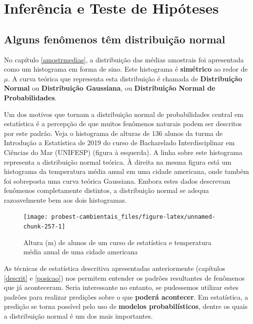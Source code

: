\documentclass[
]{book}
\begin{document}
\hypertarget{part-inferuxeancia-e-teste-de-hipuxf3teses}{%
\part{Inferência e Teste de Hipóteses}\label{part-inferuxeancia-e-teste-de-hipuxf3teses}}

\hypertarget{normdist}{%
\chapter{Alguns fenômenos têm distribuição normal}\label{normdist}}

No capítulo \ref{amostrmedias}, a distribuição das médias amostrais foi apresentada como um histograma em forma de sino. Este histograma é \textbf{simétrico} ao redor de \(\mu\). A curva teórica que representa esta distribuição é chamada de \textbf{Distribuição Normal} ou \textbf{Distribuição Gaussiana}, ou \textbf{Distribuição Normal de Probabilidades}.

Um dos motivos que tornam a distribuição normal de probabilidades central em estatística é a percepção de que muitos fenômenos naturais podem ser descritos por este padrão. Veja o histograma de alturas de 136 alunos da turma de Introdução a Estatística de 2019 do curso de Bacharelado Interdisciplinar em Ciências do Mar (UNIFESP) (figura à esquerda). A linha sobre este histograma representa a distribuição normal teórica. À direita na mesma figura está um histograma da temperatura média anual em uma cidade americana, onde também foi sobreposta uma curva teórica Gaussiana. Embora estes dados descrevam fenômenos completamente distintos, a distribuição normal se adequa razoavelmente bem aos dois histogramas.

\begin{figure}

{\centering \texttt{[image: probest-cambientais\_files/figure-latex/unnamed-chunk-257-1]} 

}

\caption{Altura (m) de alunos de um curso de estatística e temperatura média anual de uma cidade americana}\label{fig:unnamed-chunk-257}
\end{figure}

As técnicas de estatística descritiva apresentadas anteriormente (capítulos \ref{descrit} e \ref{posicao}) nos permitem entender os padrões resultantes de fenômenos que já aconteceram. Seria interessante no entanto, se pudessemos utilizar estes padrões para realizar predições sobre o que \textbf{poderá acontecer}. Em estatística, a predição se torna possível pelo uso de \textbf{modelos probabilísticos}, dentre os quais a distribuição normal é um dos mais importantes.
\end{document}
